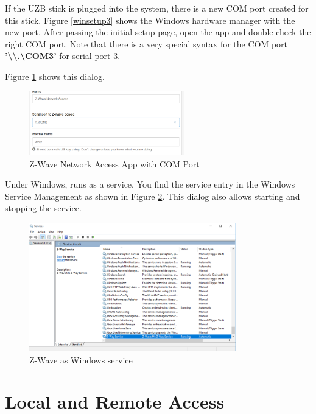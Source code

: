 If the UZB stick is plugged into the system, there is a new COM port created for this stick. 
Figure \ref{winsetup3} shows the Windows hardware manager with the new port. After passing 
the initial setup page, open the app  and double check the 
right COM port. Note that there is a very special syntax for the COM port 
\textbf{'\textbackslash \textbackslash.\textbackslash COM3'} for serial port 3.

Figure \ref{winsetup4} shows this dialog.

\begin{figure}
\begin{center}
\includegraphics[width=0.6\textwidth]{pngs/cap3/winsetup4.png}
\caption{Z-Wave Network Access App with COM Port}
\label{winsetup4}
\end{center}
\end{figure}

Under Windows, \zway runs as a service. You find the service entry in the Windows Service 
Management as shown in Figure \ref{winsetup5}. This dialog also allows starting and stopping 
the service.

\begin{figure}
\begin{center}
\includegraphics[width=0.8\textwidth]{pngs/cap3/winsetup5.png}
\caption{Z-Wave as Windows service}
\label{winsetup5}
\end{center}
\end{figure}

\section {Local and Remote Access}
\label{remoteaccess}

